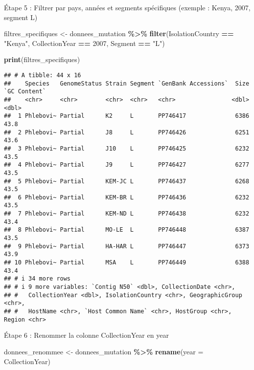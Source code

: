 \documentclass[
]{article}
\newenvironment{Shaded}{\begin{snugshade}}{\end{snugshade}}
\newcommand{\AttributeTok}[1]{\textcolor[rgb]{0.13,0.29,0.53}{#1}}
\newcommand{\DecValTok}[1]{\textcolor[rgb]{0.00,0.00,0.81}{#1}}
\newcommand{\FunctionTok}[1]{\textcolor[rgb]{0.13,0.29,0.53}{\textbf{#1}}}
\newcommand{\NormalTok}[1]{#1}
\newcommand{\OtherTok}[1]{\textcolor[rgb]{0.56,0.35,0.01}{#1}}
\newcommand{\SpecialCharTok}[1]{\textcolor[rgb]{0.81,0.36,0.00}{\textbf{#1}}}
\newcommand{\StringTok}[1]{\textcolor[rgb]{0.31,0.60,0.02}{#1}}
\begin{document}
Étape 5 : Filtrer par pays, années et segments spécifiques (exemple :
Kenya, 2007, segment L)

\begin{Shaded}
\begin{Highlighting}[]
\NormalTok{filtres\_specifiques }\OtherTok{\textless{}{-}}\NormalTok{ donnees\_mutation }\SpecialCharTok{\%\textgreater{}\%}
  \FunctionTok{filter}\NormalTok{(IsolationCountry }\SpecialCharTok{==} \StringTok{"Kenya"}\NormalTok{, CollectionYear }\SpecialCharTok{==} \DecValTok{2007}\NormalTok{, Segment }\SpecialCharTok{==} \StringTok{"L"}\NormalTok{)}

\FunctionTok{print}\NormalTok{(filtres\_specifiques)}
\end{Highlighting}
\end{Shaded}

\begin{verbatim}
## # A tibble: 44 x 16
##    Species   GenomeStatus Strain Segment `GenBank Accessions`  Size `GC Content`
##    <chr>     <chr>        <chr>  <chr>   <chr>                <dbl>        <dbl>
##  1 Phlebovi~ Partial      K2     L       PP746417              6386         43.8
##  2 Phlebovi~ Partial      J8     L       PP746426              6251         43.6
##  3 Phlebovi~ Partial      J10    L       PP746425              6232         43.5
##  4 Phlebovi~ Partial      J9     L       PP746427              6277         43.5
##  5 Phlebovi~ Partial      KEM-JC L       PP746437              6268         43.5
##  6 Phlebovi~ Partial      KEM-BR L       PP746436              6232         43.5
##  7 Phlebovi~ Partial      KEM-ND L       PP746438              6232         43.4
##  8 Phlebovi~ Partial      MO-LE  L       PP746448              6387         43.5
##  9 Phlebovi~ Partial      HA-HAR L       PP746447              6373         43.9
## 10 Phlebovi~ Partial      MSA    L       PP746449              6388         43.4
## # i 34 more rows
## # i 9 more variables: `Contig N50` <dbl>, CollectionDate <chr>,
## #   CollectionYear <dbl>, IsolationCountry <chr>, GeographicGroup <chr>,
## #   HostName <chr>, `Host Common Name` <chr>, HostGroup <chr>, Region <chr>
\end{verbatim}

Étape 6 : Renommer la colonne CollectionYear en year

\begin{Shaded}
\begin{Highlighting}[]
\NormalTok{donnees\_renommee }\OtherTok{\textless{}{-}}\NormalTok{ donnees\_mutation }\SpecialCharTok{\%\textgreater{}\%}
  \FunctionTok{rename}\NormalTok{(}\AttributeTok{year =}\NormalTok{ CollectionYear)}
\end{Highlighting}
\end{Shaded}
\end{document}
